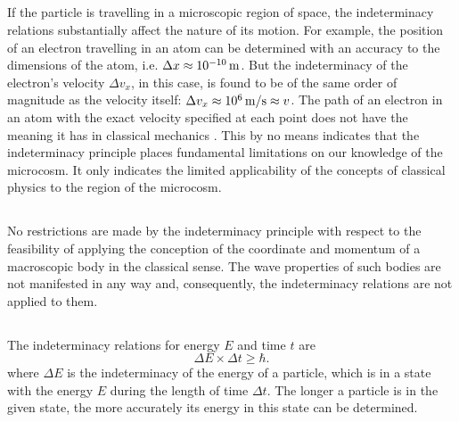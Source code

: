 \subsection{}\label{38.6.4} If the particle is travelling in a microscopic region of space, the indeterminacy relations substantially affect the nature of its motion. For example, the position of an electron travelling in an atom can be determined with an accuracy to the dimensions of the atom, i.e. $\Delta x  \approx \SI{d-10}{\meter}$. But the indeterminacy of the electron's velocity $\Delta v_{x}$, in this case, is found to be of the same order of magnitude as the velocity itself: $\Delta v_{x}  \approx \SI{d6}{\meter\per\second} \approx v$. The path of an electron in an atom with the exact velocity specified at each point does not have the meaning it has in classical mechanics . This by no means indicates that the indeterminacy principle places fundamental limitations on our knowledge of the microcosm. It only indicates the limited applicability of the concepts of classical physics to the region of the microcosm.

\subsection{}\label{38.6.5} No restrictions are made by the indeterminacy principle with respect to the feasibility of applying the conception of the coordinate and momentum of a macroscopic body in the classical sense. The wave properties of such bodies are not manifested in any way  and, consequently, the indeterminacy relations are not applied to them.

\subsection{}\label{38.6.6} The indeterminacy relations for energy $E$ and time $t$ are
\begin{equation*}%
\Delta E \times \Delta t  \geqslant \hbar.
\end{equation*}
where $\Delta E$ is the indeterminacy of the energy of a particle, which is in a state with the energy $E$ during the length of time $\Delta t$. The longer a particle is in the given state, the more accurately its energy in this state can be determined.

